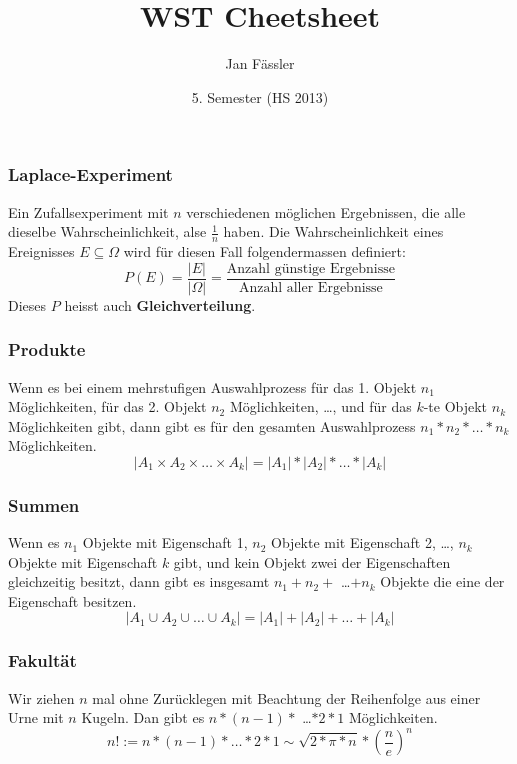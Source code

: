 \documentclass[landscape,twocolumn,a4paper]{article}
\title{
	\vspace{5cm}
	WST Cheetsheet
}
\author{ Jan Fässler}
\date{5. Semester (HS 2013)}
\begin{document}
\subsubsection*{Laplace-Experiment}
Ein Zufallsexperiment mit $n$ verschiedenen möglichen Ergebnissen, die alle dieselbe Wahrscheinlichkeit, alse $\frac{1}{n}$ haben. Die Wahrscheinlichkeit eines Ereignisses $E \subseteq\Omega$ wird für diesen Fall folgendermassen definiert:
\begin{equation}
  P(E)=\frac{|E|}{|\Omega|}=\frac{\text{Anzahl günstige Ergebnisse}}{\text{Anzahl aller Ergebnisse}}
\end{equation}
Dieses $P$ heisst auch \textbf{Gleichverteilung}. 

\subsubsection*{Produkte}
Wenn es bei einem mehrstufigen Auswahlprozess für das 1. Objekt $n_1$ Möglichkeiten, für das 2. Objekt $n_2$ Möglichkeiten, \dots , und für das $k$-te Objekt $n_k$ Möglichkeiten gibt, dann gibt es für den gesamten Auswahlprozess $n_1*n_2* \dots * n_k$ Möglichkeiten.
\begin{equation}
  |A_1 \times A_2 \times \dots \times A_k| = |A_1| * |A_2| * \dots * |A_k|
\end{equation}

\subsubsection*{Summen}
Wenn es $n_1$ Objekte mit Eigenschaft 1, $n_2$ Objekte mit Eigenschaft 2, \dots, $n_k$ Objekte mit Eigenschaft $k$ gibt, und kein Objekt zwei der Eigenschaften gleichzeitig besitzt, dann gibt es insgesamt $n_1+n_2+$ \dots $+n_k$ Objekte die eine der Eigenschaft besitzen.
\begin{equation}
  |A_1 \cup A_2 \cup \dots \cup A_k| = |A_1| + |A_2| + \dots + |A_k|
\end{equation}

\subsubsection*{Fakultät}
Wir ziehen $n$ mal ohne Zurücklegen mit Beachtung der Reihenfolge aus einer Urne mit $n$ Kugeln. Dan gibt es $n*(n-1)*$ \dots $*2*1$ Möglichkeiten.
\begin{equation}
	n! := n*(n-1)* \dots *2*1 \sim \sqrt{2*\pi*n}*(\frac{n}{e})^n
\end{equation}
\end{document}
